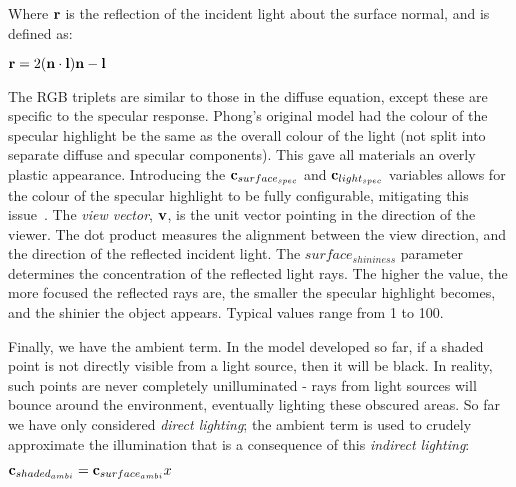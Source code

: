 Where \begin{math}\mathbf{r}\end{math} is the reflection of the incident light about the surface normal, and is defined as:

\begin{center}
	\begin{math}\mathbf{r} = 2(\mathbf{n}\cdot\mathbf{l})\mathbf{n} - \mathbf{l}\end{math}	
\end{center}

The RGB triplets are similar to those in the diffuse equation, except these are specific to the specular response. Phong's original model had the colour of the specular highlight be the same as the overall colour of the light (not split into separate diffuse and specular components). This gave all materials an overly plastic appearance. Introducing the \begin{math}\mathbf{c}_{surface_{spec}}\end{math} and \begin{math}\mathbf{c}_{light_{spec}}\end{math} variables allows for the colour of the specular highlight to be fully configurable, mitigating this issue~\cite{LightingModelForComputerAnimators}. The \textit{view vector}, \begin{math}\mathbf{v}\end{math}, is the unit vector pointing in the direction of the viewer. The dot product measures the alignment between the view direction, and the direction of the reflected incident light. The \begin{math}surface_{shininess}\end{math} parameter determines the concentration of the reflected light rays. The higher the value, the more focused the reflected rays are, the smaller the specular highlight becomes, and the shinier the object appears. Typical values range from 1 to 100.

Finally, we have the ambient term. In the model developed so far, if a shaded point is not directly visible from a light source, then it will be black. In reality, such points are never completely unilluminated - rays from light sources will bounce around the environment, eventually lighting these obscured areas. So far we have only considered \textit{direct lighting}; the ambient term is used to crudely approximate the illumination that is a consequence of this \textit{indirect lighting}:

\begin{center}
	\begin{math}\mathbf{c}_{shaded_{ambi}} = \mathbf{c}_{surface_{ambi}}x\end{math}
\end{center}

